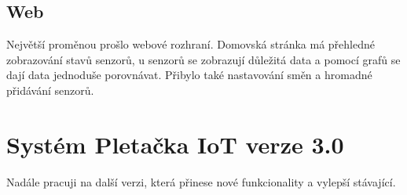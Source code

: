 \subsection{Web}
Největší proměnou prošlo webové rozhraní. Domovská stránka má přehledné zobrazování stavů senzorů, u senzorů se zobrazují důležitá data a pomocí grafů se dají data jednoduše porovnávat.
Přibylo také nastavování směn a hromadné přidávání senzorů.



\section{Systém Pletačka IoT verze 3.0}
Nadále pracuji na další verzi, která přinese nové funkcionality a vylepší stávající. 

\newpage